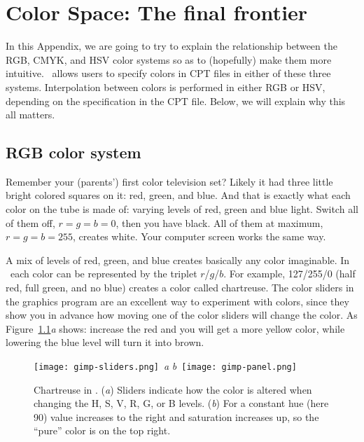 %
%
\chapter{Color Space: The final frontier}
\label{app:I}
\thispagestyle{headings}


In this Appendix, we are going to try to explain the relationship
between the RGB, CMYK, and HSV color systems so as to (hopefully) make
them more intuitive.  \GMT\ allows users to specify colors in CPT
files in either of these three systems. Interpolation between colors is performed in either RGB or HSV, depending on the specification in the CPT file. Below, we will explain why this all matters.

\section{RGB color system}
Remember your (parents') first color television set? Likely it had three little bright colored squares on it: red, green, and blue. And that is exactly what each color on the tube is made of: varying levels of red, green and blue light. Switch all of them off, $r=g=b=0$, then you have black. All of them at maximum, $r=g=b=255$, creates white. Your computer screen works the same way.

A mix of levels of red, green, and blue creates basically any color imaginable. In \GMT\ each color can be represented by the triplet $r$/$g$/$b$. For example, 127/255/0 (half red, full green, and no blue) creates a color called chartreuse. The color sliders in the graphics program  are an excellent way to experiment with colors, since they show you in advance how moving one of the color sliders will change the color. As Figure~\ref{fig:gimp}\emph{a} shows: increase the red and you will get a more yellow color, while lowering the blue level will turn it into brown.

\begin{figure}[b]
   \texttt{[image: gimp-sliders.png]}~\emph{a}\hfill
   \emph{b}~\texttt{[image: gimp-panel.png]}
   \caption{Chartreuse in \protect{}. (\emph{a}) Sliders indicate how the color is altered when changing the H, S, V, R, G, or B levels. (\emph{b}) For a constant hue (here 90\DS) value increases to the right and saturation increases up, so the ``pure'' color is on the top right.}
   \label{fig:gimp}
\end{figure}

